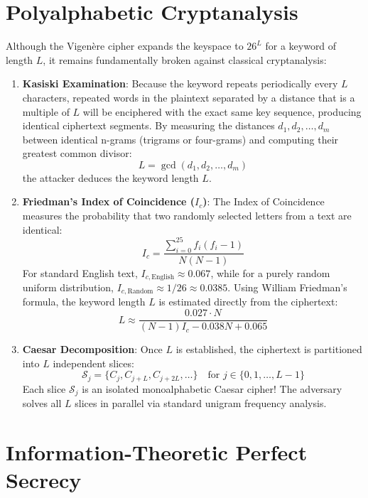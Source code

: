 \documentclass[12pt,a4paper]{report}
\begin{document}
\section{Polyalphabetic Cryptanalysis}
Although the Vigen\`ere cipher expands the keyspace to $26^L$ for a keyword of length $L$, it remains fundamentally broken against classical cryptanalysis:
\begin{enumerate}
    \item \textbf{Kasiski Examination}: Because the keyword repeats periodically every $L$ characters, repeated words in the plaintext separated by a distance that is a multiple of $L$ will be enciphered with the exact same key sequence, producing identical ciphertext segments. By measuring the distances $d_1, d_2, \dots, d_m$ between identical n-grams (trigrams or four-grams) and computing their greatest common divisor:
    \begin{equation}
        L = \gcd(d_1, d_2, \dots, d_m)
    \end{equation}
    the attacker deduces the keyword length $L$.
    \item \textbf{Friedman's Index of Coincidence ($I_c$)}: The Index of Coincidence measures the probability that two randomly selected letters from a text are identical:
    \begin{equation}
        I_c = \frac{\sum_{i=0}^{25} f_i (f_i - 1)}{N (N - 1)}
    \end{equation}
    For standard English text, $I_{c,\text{English}} \approx 0.067$, while for a purely random uniform distribution, $I_{c,\text{Random}} \approx 1/26 \approx 0.0385$. Using William Friedman's formula, the keyword length $L$ is estimated directly from the ciphertext:
    \begin{equation}
        L \approx \frac{0.027 \cdot N}{(N - 1) I_c - 0.038 N + 0.065}
    \end{equation}
    \item \textbf{Caesar Decomposition}: Once $L$ is established, the ciphertext is partitioned into $L$ independent slices:
    \begin{equation}
        \mathcal{S}_j = \{C_j, C_{j+L}, C_{j+2L}, \dots\} \quad \text{for } j \in \{0, 1, \dots, L-1\}
    \end{equation}
    Each slice $\mathcal{S}_j$ is an isolated monoalphabetic Caesar cipher! The adversary solves all $L$ slices in parallel via standard unigram frequency analysis.
\end{enumerate}

\section{Information-Theoretic Perfect Secrecy}
\end{document}
